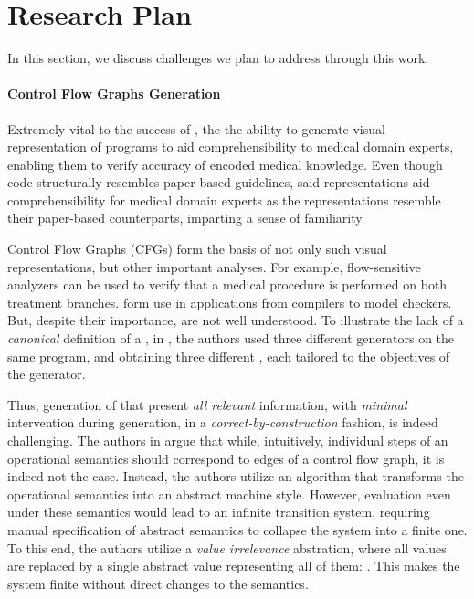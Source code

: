 \section{Research Plan}

In this section, we discuss challenges we plan to address through this work.

\paragraph{Control Flow Graphs Generation}

Extremely vital to the success of \MediK{}, the the ability
to generate visual representation of \MediK{} programs to aid
comprehensibility to medical domain experts, enabling them to verify
accuracy of encoded medical knowledge. Even though \MediK{} code
structurally resembles paper-based guidelines, said
representations aid comprehensibility for medical
domain experts as the representations resemble their paper-based counterparts,
imparting a sense of familiarity.

Control Flow Graphs (CFGs) form the basis of not only such visual
representations, but other important analyses. For example,
flow-sensitive analyzers can be used to verify that a medical procedure
is performed on both treatment branches.
\CGSs{} form use in applications from compilers to model checkers.
But, despite their importance, \CGSs{} are not well understood.
To illustrate the lack of a \emph{canonical} definition of a \CGS{},
in \cite{KoppelICFP22}, the authors
used three different \CFG{} generators
on the same program, and obtaining three different \CFGs{}, each
tailored to the objectives of the generator.

Thus, generation of \CFGs{} that present \emph{all relevant} information,
with \emph{minimal} intervention during generation, in a
\emph{correct-by-construction} fashion, is indeed challenging.
The authors in \cite{KoppelICFP22} argue that while, intuitively, individual
steps of an operational semantics should correspond to edges of a control
flow graph, it is indeed not the case. Instead, the authors utilize
an algorithm that transforms the operational semantics into an abstract machine
style. However, evaluation even under these semantics would lead to
an infinite transition system, requiring manual specification of abstract
semantics to collapse the system into a finite one. To this end, the
authors utilize a \emph{value irrelevance} abstration, where all values
are replaced by a single abstract value representing all of them: \bigstartext.
This makes the system finite without direct changes to the semantics.


